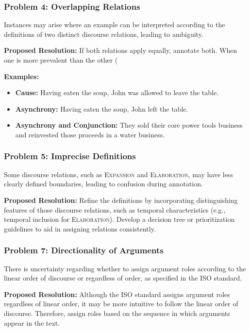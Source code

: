 \documentclass{udisc}
\begin{document}
\begin{itemize}
\subsubsection{Problem 4: Overlapping Relations}

Instances may arise where an example can be interpreted according to the definitions of two distinct discourse relations, leading to ambiguity.

\textbf{Proposed Resolution:} If both relations apply equally, annotate both. When one is more prevalent than the other (%

\textbf{Examples:}

\begin{itemize}
    \item \textbf{Cause:} Having eaten the soup, John was allowed to leave the table.
    \item \textbf{Asynchrony:} Having eaten the soup, John left the table.
    \item \textbf{Asynchrony and Conjunction:} They sold their core power tools business and reinvested those proceeds in a water business.
\end{itemize}

\subsubsection{Problem 5: Imprecise Definitions}

Some discourse relations, such as \textsc{Expansion} and \textsc{Elaboration}, may have less clearly defined boundaries, leading to confusion during annotation.

\textbf{Proposed Resolution:} Refine the definitions by incorporating distinguishing features of those discourse relations, such as temporal characteristics (e.g., temporal inclusion for \textsc{Elaboration}). Develop a decision tree or prioritization guidelines to aid in assigning relations consistently.

\subsubsection{Problem 7: Directionality of Arguments}

There is uncertainty regarding whether to assign argument roles according to the linear order of discourse or regardless of order, as specified in the ISO standard.

\textbf{Proposed Resolution:} Although the ISO standard assigns argument roles regardless of linear order, it may be more intuitive to follow the linear order of discourse. Therefore, assign roles based on the sequence in which arguments appear in the text.


\end{itemize}
\end{document}

